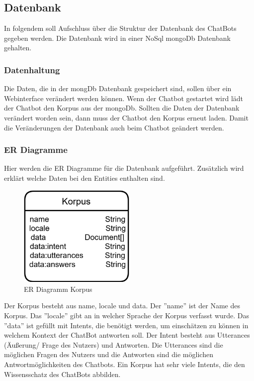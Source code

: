 \newpage
\subsection{Datenbank}
In folgendem soll Aufschluss über die Struktur der Datenbank des ChatBots gegeben werden.
Die Datenbank wird in einer NoSql mongoDb Datenbank gehalten.

\subsubsection{Datenhaltung}
Die Daten, die in der mongDb Datenbank gespeichert sind, sollen über ein Webinterface verändert werden können.
Wenn der Chatbot gestartet wird lädt der Chatbot den Korpus aus der mongoDb.
Sollten die Daten der Datenbank verändert worden sein, dann muss der Chatbot den Korpus erneut laden.
Damit die Veränderungen der Datenbank auch beim Chatbot geändert werden.

\subsubsection{ER Diagramme}
Hier werden die ER Diagramme für die Datenbank aufgeführt.
Zusätzlich wird erklärt welche Daten bei den Entities enthalten sind.

\begin{figure}[H]
    \centering
    \includegraphics[width=0.5\textwidth]{bilder/technologien/ERMDiagram.png}
    \caption{ER Diagramm Korpus}
    \label{fig:ER_Diagramm_Korpus}
\end{figure}

\noindent Der Korpus besteht aus name, locale und data. 
Der ''name'' ist der Name des Korpus. 
Das ''locale'' gibt an in welcher Sprache der Korpus verfasst wurde. 
Das ''data'' ist gefüllt mit Intents, die benötigt werden, um einschätzen zu können in welchem Kontext der ChatBot antworten soll. 
Der Intent besteht aus Utterances (Äußerung/ Frage des Nutzers) und Antworten. 
Die Utterances sind die möglichen Fragen des Nutzers und die Antworten sind die möglichen Antwortmöglichkeiten des Chatbots. 
Ein Korpus hat sehr viele Intents, die den Wissensschatz des ChatBots abbilden. 

